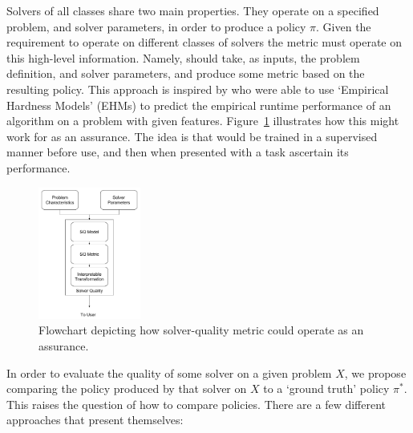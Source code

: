     Solvers of all classes share two main properties. They operate on a specified problem, and solver parameters, in order to produce a policy $\pi$. Given the requirement to operate on different classes of solvers the \xQ{} metric must operate on this high-level information. Namely, \xQ{} should take, as inputs, the problem definition, and solver parameters, and produce some metric based on the resulting policy. This approach is inspired by \cite{Leyton-Brown2009-yr} who were able to use `Empirical Hardness Models' (EHMs) to predict the empirical runtime performance of an algorithm on a problem with given features. Figure~\ref{fig:SQ_flowchart} illustrates how this might work for \xQ{} as an assurance. The idea is that \xQ{} would be trained in a supervised manner before use, and then when presented with a task ascertain its performance.

    \begin{figure}[tbp]
        \centering
        \includegraphics[width=0.3\textwidth]{Figures/SQ_EHM.pdf}
        \caption{Flowchart depicting how solver-quality metric could operate as an assurance.}
        \label{fig:SQ_flowchart}
    \end{figure}

    In order to evaluate the quality of some solver on a given problem $X$, we propose comparing the policy produced by that solver on $X$ to a `ground truth' policy $\pi^*$. This raises the question of how to compare policies. There are a few different approaches that present themselves:

